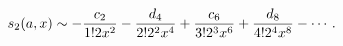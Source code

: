 \[s_{2}(a,x)\sim-\frac{c_{2}}{1!2x^{2}}-\frac{d_{4}}{2!2^{2}x^{4}}+\frac{c_{6}}{%
3!2^{3}x^{6}}+\frac{d_{8}}{4!2^{4}x^{8}}-\cdots.\]
